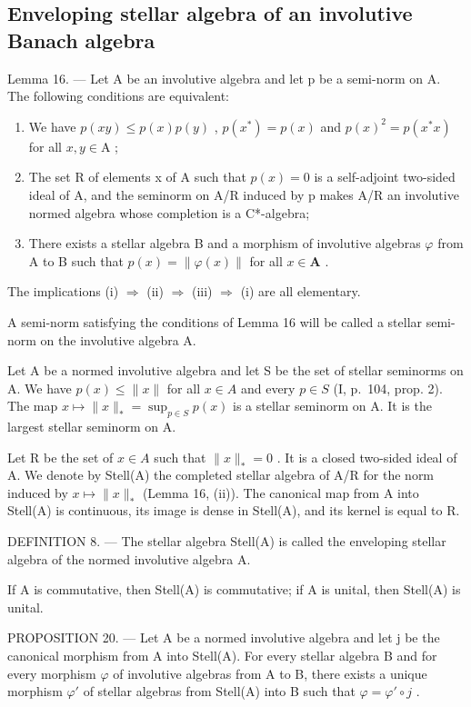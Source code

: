 \subsection{Enveloping stellar algebra of an involutive Banach algebra}

Lemma 16. --- Let A be an involutive algebra and let p be a semi-norm on A. The following conditions are equivalent:

\begin{enumerate}
\def\labelenumi{(\roman{enumi})}
\item
  We have \(p(xy) \leqslant p(x)p(y)\) , \(p(x^{*}) = p(x)\) and \(p(x)^{2} = p(x^{*}x)\) for all \(x, y \in \mathrm{A}\) ;
\item
  The set R of elements x of A such that \(p(x) = 0\) is a self-adjoint two-sided ideal of A, and the seminorm on A/R induced by p makes A/R an involutive normed algebra whose completion is a C*-algebra;
\item
  There exists a stellar algebra B and a morphism of involutive algebras \(\varphi\) from A to B such that \(p(x) = \|\varphi(x)\|\) for all \(x\in\mathbf{A}\) .
\end{enumerate}

The implications (i) \(\Longrightarrow\) (ii) \(\Longrightarrow\) (iii) \(\Longrightarrow\) (i) are all elementary.

A semi-norm satisfying the conditions of Lemma 16 will be called a stellar semi-norm on the involutive algebra A.

Let A be a normed involutive algebra and let S be the set of stellar seminorms on A. We have \(p(x) \leqslant \|x\|\) for all \(x \in A\) and every \(p \in S\) (I, p.~104, prop. 2). The map \(x \mapsto \|x\|_* = \sup_{p \in S} p(x)\) is a stellar seminorm on A. It is the largest stellar seminorm on A.

Let R be the set of \(x \in A\) such that \(\|x\|_{*} = 0\) . It is a closed two-sided ideal of A. We denote by Stell(A) the completed stellar algebra of A/R for the norm induced by \(x \mapsto \|x\|_{*}\) (Lemma 16, (ii)). The canonical map from A into Stell(A) is continuous, its image is dense in Stell(A), and its kernel is equal to R.

DEFINITION 8. --- The stellar algebra Stell(A) is called the enveloping stellar algebra of the normed involutive algebra A.

If A is commutative, then Stell(A) is commutative; if A is unital, then Stell(A) is unital.

PROPOSITION 20. --- Let A be a normed involutive algebra and let j be the canonical morphism from A into Stell(A). For every stellar algebra B and for every morphism \(\varphi\) of involutive algebras from A to B, there exists a unique morphism \(\varphi'\) of stellar algebras from Stell(A) into B such that \(\varphi = \varphi' \circ j\) .

